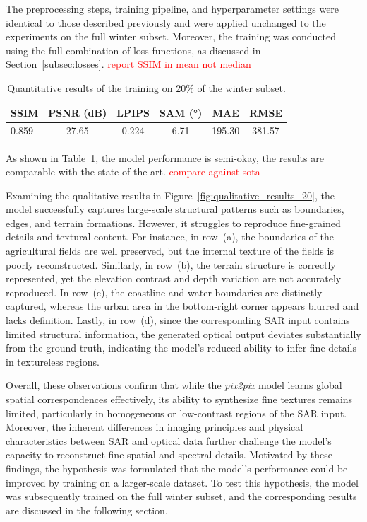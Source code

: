 The preprocessing steps, training pipeline, and hyperparameter settings were identical to those described previously and were applied unchanged to the experiments on the full winter subset. Moreover, the training was conducted using the full combination of loss functions, as discussed in Section~\ref{subsec:losses}.
\textcolor{red}{report SSIM in mean not median}
\begin{table}[h!]
\centering
\caption[Quantitative results of 20\% training winter subset]{Quantitative results of the training on 20\% of the winter subset.}
\begin{tabular}{lccccc}
\toprule
\textbf{SSIM} & \textbf{PSNR (dB)} & \textbf{LPIPS} & \textbf{SAM (°)} & \textbf{MAE} & \textbf{RMSE} \\
\midrule
0.859 & 27.65 & 0.224 & 6.71 & 195.30 & 381.57 \\
\bottomrule
\end{tabular}
\label{tab:quantitative_result_20}
\end{table}

As shown in Table~\ref{tab:quantitative_result_20}, the model performance is semi-okay, the results are comparable with the state-of-the-art. 
\textcolor{red}{compare against sota}

Examining the qualitative results in Figure~\ref{fig:qualitative_results_20}, the model successfully captures large-scale structural patterns such as boundaries, edges, and terrain formations. However, it struggles to reproduce fine-grained details and textural content. For instance, in row~(a), the boundaries of the agricultural fields are well preserved, but the internal texture of the fields is poorly reconstructed. Similarly, in row~(b), the terrain structure is correctly represented, yet the elevation contrast and depth variation are not accurately reproduced. In row~(c), the coastline and water boundaries are distinctly captured, whereas the urban area in the bottom-right corner appears blurred and lacks definition. Lastly, in row~(d), since the corresponding SAR input contains limited structural information, the generated optical output deviates substantially from the ground truth, indicating the model’s reduced ability to infer fine details in textureless regions.

Overall, these observations confirm that while the \textit{pix2pix} model learns global spatial correspondences effectively, its ability to synthesize fine textures remains limited, particularly in homogeneous or low-contrast regions of the SAR input. Moreover, the inherent differences in imaging principles and physical characteristics between SAR and optical data further challenge the model’s capacity to reconstruct fine spatial and spectral details. Motivated by these findings, the hypothesis was formulated that the model’s performance could be improved by training on a larger-scale dataset. To test this hypothesis, the model was subsequently trained on the full winter subset, and the corresponding results are discussed in the following section.

